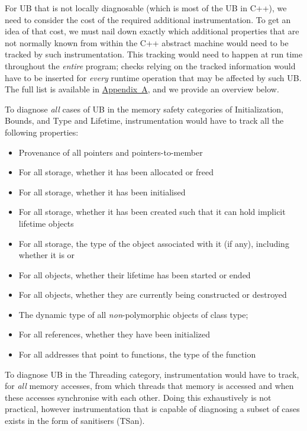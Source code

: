 For UB that is not locally diagnosable (which is most of the UB in C++), we need to consider the cost of the required additional instrumentation. To get an idea of that cost, we must nail down exactly which additional properties that are not normally known from within the C++ abstract machine would need to be tracked by such instrumentation. This tracking would need to happen at run time throughout the \emph{entire} program; checks relying on the tracked information would have to be inserted for \emph{every} runtime operation that may be affected by such UB.
The full list is available in \hyperref[appendix]{Appendix~A}, and we provide an overview below.

To diagnose \emph{all} cases of UB in the memory safety categories of Initialization, Bounds, and Type and Lifetime, instrumentation would have to track all the following properties:

\begin{itemize}
\item Provenance of all pointers and pointers-to-member
\item For all storage, whether it has been allocated or freed
\item For all storage, whether it has been initialised
\item For all storage, whether it has been created such that it can hold implicit lifetime objects
\item For all storage, the type of the object associated with it (if any), including whether it is  or 
\item For all objects, whether their lifetime has been started or ended
\item For all objects, whether they are currently being constructed or destroyed
\item The dynamic type of all \emph{non}-polymorphic objects of class type;
\item For all references, whether they have been initialized
\item For all addresses that point to  functions, the type of the function
\end{itemize}

To diagnose UB in the Threading category, instrumentation would have to track, for \emph{all} memory accesses, from which threads that memory is accessed and when these accesses synchronise with each other. Doing this exhaustively is not practical, however instrumentation that is capable of diagnosing a subset of cases exists in the form of sanitisers (TSan).

